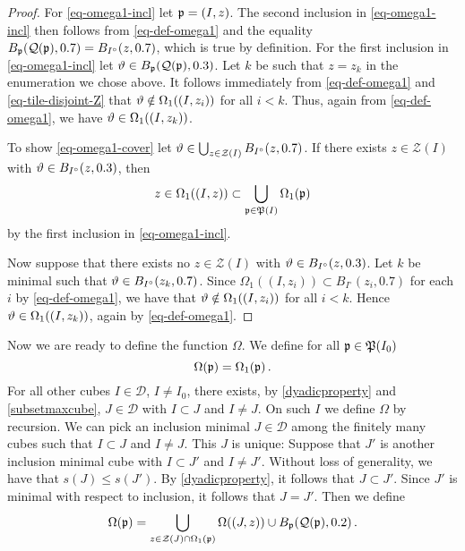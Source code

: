 \begin{proof}
    \leanok
    For \eqref{eq-omega1-incl} let ${\mathfrak p} = (I, z)$.
    The second inclusion in \eqref{eq-omega1-incl} then follows from \eqref{eq-def-omega1} and the equality $B_{{\mathfrak p}}({\mathcal{Q}}({\mathfrak p}), 0.7) = B_{I^\circ}(z, 0.7)$, which is true by definition.
    For the first inclusion in \eqref{eq-omega1-incl} let ${\vartheta} \in B_{{\mathfrak p}}({\mathcal{Q}}({\mathfrak p}),0.3)$. Let $k$ be such that $z = z_k$ in the enumeration we chose above. It follows immediately from \eqref{eq-def-omega1} and \eqref{eq-tile-disjoint-Z} that
    ${\vartheta} \notin \Omega_1((I, z_i))$ for all $i < k$. Thus, again from \eqref{eq-def-omega1}, we have
    ${\vartheta} \in \Omega_1((I,z_k))$.

    To show \eqref{eq-omega1-cover} let ${\vartheta} \in \bigcup_{z \in \mathcal{Z}(I)} B_{I^\circ}(z,0.7)$.
    If there exists $z \in \mathcal{Z}(I)$ with ${\vartheta} \in B_{I^\circ}(z,0.3)$, then
    $$
        z \in \Omega_1((I, z)) \subset \bigcup_{{\mathfrak p} \in {\mathfrak P}(I)} \Omega_1({\mathfrak p})
    $$
    by the first inclusion in \eqref{eq-omega1-incl}.

    Now suppose that there exists no $z \in \mathcal{Z}(I)$ with ${\vartheta} \in B_{I^\circ}(z, 0.3)$. Let $k$ be minimal such that ${\vartheta} \in B_{I^\circ}(z_k, 0.7)$. Since $\Omega_1((I, z_i)) \subset B_{I^\circ}(z_i, 0.7)$ for each $i$ by \eqref{eq-def-omega1}, we have that ${\vartheta} \notin \Omega_1((I, z_i))$ for all $i < k$. Hence ${\vartheta} \in \Omega_1((I, z_k))$, again by \eqref{eq-def-omega1}.
\end{proof}

Now we are ready to define the function $\Omega$. We define for all ${\mathfrak p} \in {\mathfrak P}(I_0)$
\begin{equation}
    \label{eq-max-omega}
    {\Omega}({\mathfrak p}) = \Omega_1({\mathfrak p})\,.
\end{equation}
For all other cubes $I \in \mathcal{D}$, $I \ne I_0$, there exists, by \eqref{dyadicproperty} and \eqref{subsetmaxcube}, $J \in \mathcal{D}$ with $I \subset J$ and $I \ne J$. On such $I$ we define $\Omega$ by recursion. We can pick an inclusion minimal $J \in \mathcal{D}$ among the finitely many cubes such that $I \subset J$ and $I \ne J$. This $J$ is unique: Suppose that $J'$ is another inclusion minimal cube with $I \subset J'$ and $I \ne J'$. Without loss of generality, we have that $s(J) \le s(J')$. By \eqref{dyadicproperty}, it follows that $J \subset J'$. Since $J'$ is minimal with respect to inclusion, it follows that $J = J'$. Then we define
\begin{equation}
    \label{eq-it-omega}
    {\Omega}({\mathfrak p}) = \bigcup_{z \in \mathcal{Z}(J) \cap \Omega_1({\mathfrak p})} \Omega((J, z)) \cup B_{{\mathfrak p}}({\mathcal{Q}}({\mathfrak p}),0.2)\,.
\end{equation}


